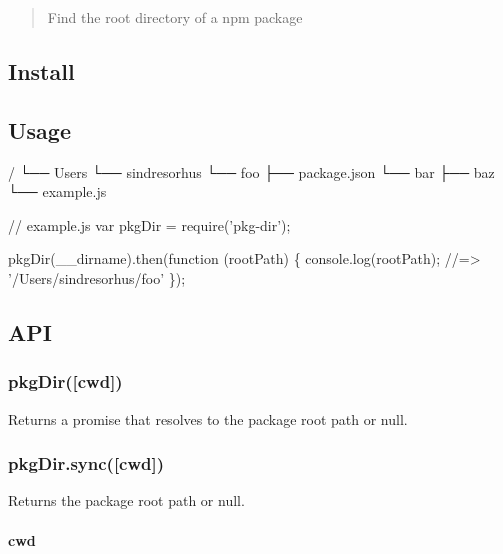 \begin{quote}
Find the root directory of a npm package \end{quote}


\subsection*{Install}




\subsection*{Usage}


\begin{DoxyCode}
/
└── Users
    └── sindresorhus
        └── foo
            ├── package.json
            └── bar
                ├── baz
                └── example.js
\end{DoxyCode}



\begin{DoxyCode}
// example.js
var pkgDir = require('pkg-dir');

pkgDir(\_\_dirname).then(function (rootPath) \{
    console.log(rootPath);
    //=> '/Users/sindresorhus/foo'
\});
\end{DoxyCode}


\subsection*{A\+PI}

\subsubsection*{pkg\+Dir(\mbox{[}cwd\mbox{]})}

Returns a promise that resolves to the package root path or {\ttfamily null}.

\subsubsection*{pkg\+Dir.\+sync(\mbox{[}cwd\mbox{]})}

Returns the package root path or {\ttfamily null}.

\paragraph*{cwd}

